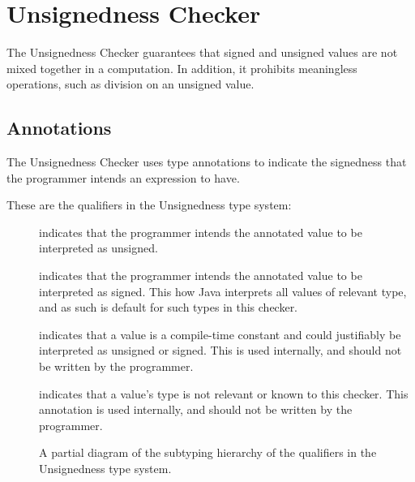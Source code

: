 \htmhr
\chapter{Unsignedness Checker\label{unsignedness-checker}}

The Unsignedness Checker guarantees that signed and unsigned values are not mixed 
together in a computation. In addition, it prohibits meaningless operations, such 
as division on an unsigned value.

\section{Annotations\label{unsignedness-checker-annotations}}

The Unsignedness Checker uses type annotations to indicate the signedness that the programmer intends an expression to have.

These are the qualifiers in the Unsignedness type system:

\begin{description}

\item[]
    indicates that the programmer intends the annotated value to be interpreted as unsigned.

\item[]
    indicates that the programmer intends the annotated value to be interpreted as signed. This how Java interprets all values of relevant type, and as such is default for such types in this checker.

\item[]
    indicates that a value is a compile-time constant and could justifiably be interpreted as unsigned or signed. This is used internally, and should not be written by the programmer.

\item[]
    indicates that a value’s type is not relevant or known to this checker. This annotation is used internally, and should not be written by the programmer.

\end{description}

\begin{figure}
\caption{A partial diagram of the subtyping hierarchy of the qualifiers in the 
Unsignedness type system.}
\label{fig-unsignedness-hierarchy}
\end{figure}

